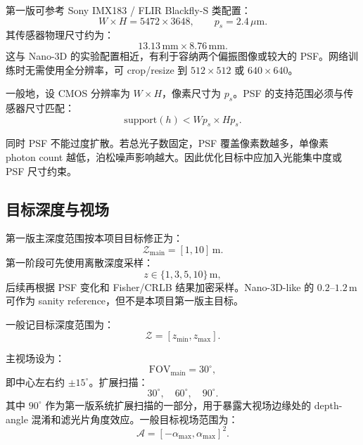 \documentclass[11pt,a4paper,fontset=none]{ctexart}
\begin{document}
第一版可参考 Sony IMX183 / FLIR Blackfly-S 类配置：
\begin{equation}
  W\times H=5472\times3648,\qquad
  p_s=2.4\,\mu\mathrm{m}.
\end{equation}
其传感器物理尺寸约为：
\begin{equation}
  13.13\,\mathrm{mm}\times 8.76\,\mathrm{mm}.
\end{equation}
这与 Nano-3D 的实验配置相近，有利于容纳两个偏振图像或较大的 PSF。网络训练时无需使用全分辨率，可 crop/resize 到 $512\times512$ 或 $640\times640$。

一般地，设 CMOS 分辨率为 $W\times H$，像素尺寸为 $p_s$。PSF 的支持范围必须与传感器尺寸匹配：
\begin{equation}
  \mathrm{support}(h)<W p_s \times H p_s.
\end{equation}

同时 PSF 不能过度扩散。若总光子数固定，PSF 覆盖像素数越多，单像素 photon count 越低，泊松噪声影响越大。因此优化目标中应加入光能集中度或 PSF 尺寸约束。

\subsection{目标深度与视场}

第一版主深度范围按本项目目标修正为：
\begin{equation}
  \mathcal Z_{\mathrm{main}}=[1,10]\,\mathrm{m}.
\end{equation}
第一阶段可先使用离散深度采样：
\begin{equation}
  z\in\{1,3,5,10\}\,\mathrm{m},
\end{equation}
后续再根据 PSF 变化和 Fisher/CRLB 结果加密采样。Nano-3D-like 的 $0.2$--$1.2\,\mathrm{m}$ 可作为 sanity reference，但不是本项目第一版主目标。

一般记目标深度范围为：
\begin{equation}
  \mathcal Z=[z_{\min},z_{\max}].
\end{equation}

主视场设为：
\begin{equation}
  \mathrm{FOV}_{\mathrm{main}}=30^\circ,
\end{equation}
即中心左右约 $\pm15^\circ$。扩展扫描：
\begin{equation}
  30^\circ,\quad 60^\circ,\quad 90^\circ.
\end{equation}
其中 $90^\circ$ 作为第一版系统扩展扫描的一部分，用于暴露大视场边缘处的 depth-angle 混淆和滤光片角度效应。一般目标视场范围为：
\begin{equation}
  \mathcal A=
  [-\alpha_{\max},\alpha_{\max}]^2.
\end{equation}
\end{document}
